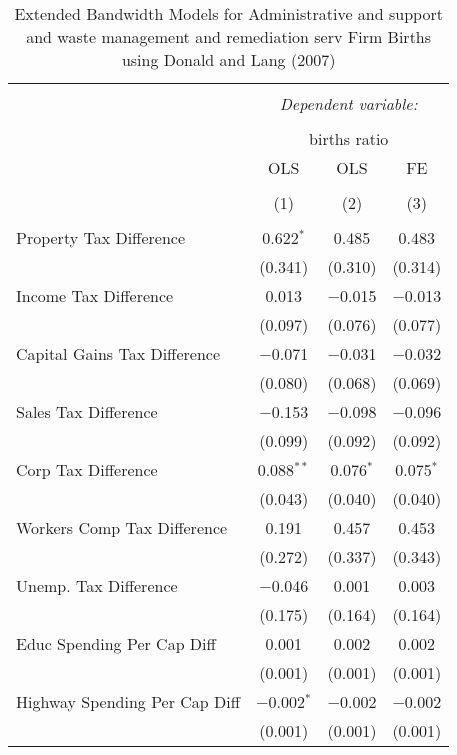 
\begin{table}[!htbp] \centering 
  \caption{Extended Bandwidth Models for  Administrative and support and waste management and remediation serv Firm Births using Donald and Lang (2007)} 
  \label{} 
\begin{tabular}{@{\extracolsep{5pt}}lccc} 
\\[-1.8ex]\hline 
\hline \\[-1.8ex] 
 & \multicolumn{3}{c}{\textit{Dependent variable:}} \\ 
\cline{2-4} 
\\[-1.8ex] & \multicolumn{3}{c}{births ratio} \\ 
 & OLS & OLS & FE \\ 
\\[-1.8ex] & (1) & (2) & (3)\\ 
\hline \\[-1.8ex] 
 Property Tax Difference & 0.622$^{*}$ & 0.485 & 0.483 \\ 
  & (0.341) & (0.310) & (0.314) \\ 
  Income Tax Difference & 0.013 & $-$0.015 & $-$0.013 \\ 
  & (0.097) & (0.076) & (0.077) \\ 
  Capital Gains Tax Difference & $-$0.071 & $-$0.031 & $-$0.032 \\ 
  & (0.080) & (0.068) & (0.069) \\ 
  Sales Tax Difference & $-$0.153 & $-$0.098 & $-$0.096 \\ 
  & (0.099) & (0.092) & (0.092) \\ 
  Corp Tax Difference & 0.088$^{**}$ & 0.076$^{*}$ & 0.075$^{*}$ \\ 
  & (0.043) & (0.040) & (0.040) \\ 
  Workers Comp Tax Difference & 0.191 & 0.457 & 0.453 \\ 
  & (0.272) & (0.337) & (0.343) \\ 
  Unemp. Tax Difference & $-$0.046 & 0.001 & 0.003 \\ 
  & (0.175) & (0.164) & (0.164) \\ 
  Educ Spending Per Cap Diff & 0.001 & 0.002 & 0.002 \\ 
  & (0.001) & (0.001) & (0.001) \\ 
  Highway Spending Per Cap Diff & $-$0.002$^{*}$ & $-$0.002 & $-$0.002 \\ 
  & (0.001) & (0.001) & (0.001) \\ 

\end{tabular}
\end{table}
